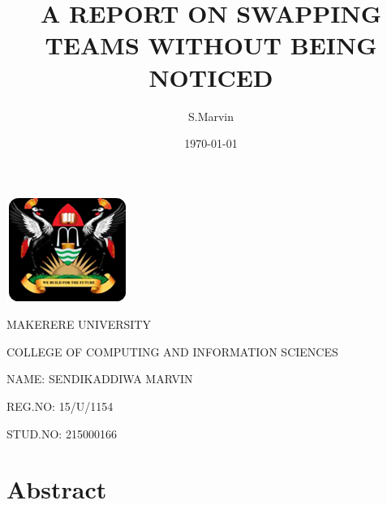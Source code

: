 \documentclass[14pt]{article}
\begin{document}
		\begin{center}\includegraphics{maklogo.PNG} \end{center}
		
		\begin{center} \begin{Huge}  MAKERERE UNIVERSITY    \end{Huge} \end{center} 

		 \begin{center}\begin{Huge}  COLLEGE OF COMPUTING AND INFORMATION SCIENCES    \end{Huge} \end{center}
	





		\begin{flushleft} \begin{huge} NAME: SENDIKADDIWA MARVIN   \end{huge} \end{flushleft}

		\begin{flushleft} \begin{huge} REG.NO: 15/U/1154   \end{huge} \end{flushleft}

		\begin{flushleft} \begin{huge} STUD.NO: 215000166    \end{huge} \end{flushleft}

		\title{A REPORT ON SWAPPING TEAMS WITHOUT BEING NOTICED}

		\author{S.Marvin}

		\date {\today}

		\maketitle

		\tableofcontents

			\section{Abstract}
\end{document}
